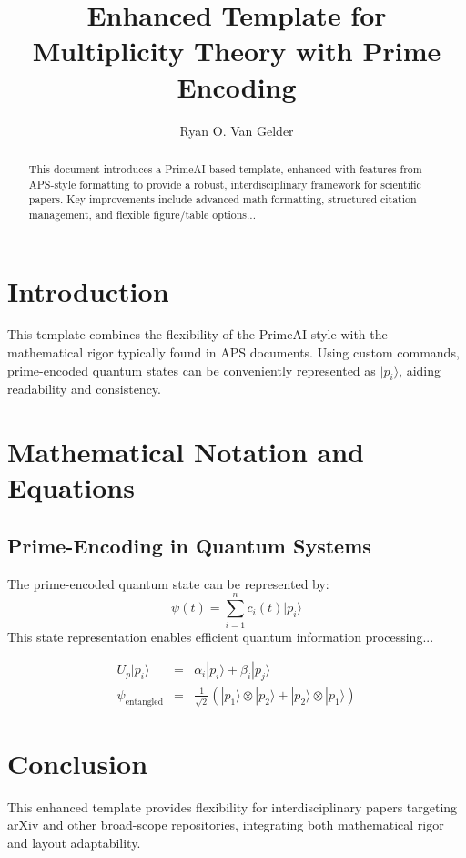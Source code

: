 \documentclass{article}
\title{Enhanced Template for Multiplicity Theory with Prime Encoding}
\author{Ryan O. Van Gelder}
\affil{Citizen Gardens, The Foundation of Multiplicity \\ \texttt{ryan@citizengardens.org}}
\newcommand{\primeQubit}[1]{|p_{#1}\rangle}
\begin{document}
\maketitle

\begin{abstract}
This document introduces a PrimeAI-based template, enhanced with features from APS-style formatting to provide a robust, interdisciplinary framework for scientific papers. Key improvements include advanced math formatting, structured citation management, and flexible figure/table options...
\end{abstract}


\section{Introduction}
This template combines the flexibility of the PrimeAI style with the mathematical rigor typically found in APS documents. Using custom commands, prime-encoded quantum states can be conveniently represented as $\primeQubit{i}$, aiding readability and consistency.

\section{Mathematical Notation and Equations}
\subsection{Prime-Encoding in Quantum Systems}
The prime-encoded quantum state can be represented by:
\begin{equation}
\psi(t) = \sum_{i=1}^{n} c_i(t) \primeQubit{i}
\end{equation}
This state representation enables efficient quantum information processing...

\begin{eqnarray}
U_p \primeQubit{i} &=& \alpha_i \primeQubit{i} + \beta_i \primeQubit{j} \\
\psi_{\text{entangled}} &=& \frac{1}{\sqrt{2}} (\primeQubit{1} \otimes \primeQubit{2} + \primeQubit{2} \otimes \primeQubit{1})
\end{eqnarray}

\section{Conclusion}
This enhanced template provides flexibility for interdisciplinary papers targeting arXiv and other broad-scope repositories, integrating both mathematical rigor and layout adaptability.


\end{document}
